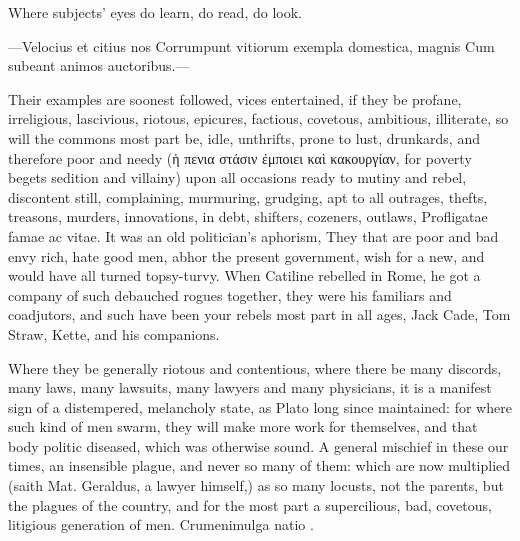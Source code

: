 {Where subjects' eyes do learn, do read, do look.

---Velocius et citius nos
Corrumpunt vitiorum exempla domestica, magnis
Cum subeant animos auctoribus.---

Their examples are soonest followed, vices entertained, if they be
profane, irreligious, lascivious, riotous, epicures, factious,
covetous, ambitious, illiterate, so will the commons most part be,
idle, unthrifts, prone to lust, drunkards, and therefore poor and needy
(ἡ πενια στάσιν ἐμποιει καὶ κακουργίαν, for poverty begets sedition and
villainy) upon all occasions ready to mutiny and rebel, discontent
still, complaining, murmuring, grudging, apt to all outrages, thefts,
treasons, murders, innovations, in debt, shifters, cozeners, outlaws,
Profligatae famae ac vitae. It was an old politician's aphorism,
They that are poor and bad envy rich, hate good men, abhor the present
government, wish for a new, and would have all turned topsy-turvy. When
Catiline rebelled in Rome, he got a company of such debauched rogues
together, they were his familiars and coadjutors, and such have been
your rebels most part in all ages, Jack Cade, Tom Straw, Kette, and his
companions.

Where they be generally riotous and contentious, where there be many
discords, many laws, many lawsuits, many lawyers and many physicians,
it is a manifest sign of a distempered, melancholy state, as Plato
long since maintained: for where such kind of men swarm, they will make
more work for themselves, and that body politic diseased, which was
otherwise sound. A general mischief in these our times, an insensible
plague, and never so many of them: which are now multiplied (saith Mat.
Geraldus, a lawyer himself,) as so many locusts, not the parents,
but the plagues of the country, and for the most part a supercilious,
bad, covetous, litigious generation of men. Crumenimulga natio \etc{}.

}
